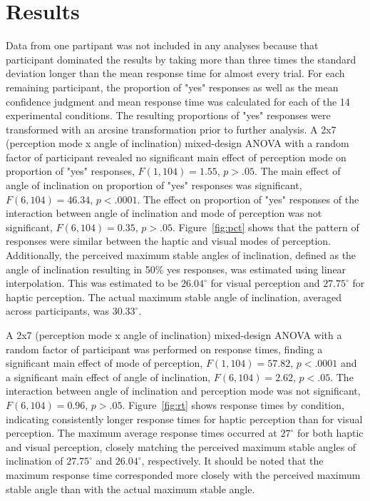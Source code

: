 \documentclass{article}
\begin{document}
\section{Results}
Data from one partipant was not included in any analyses because that participant dominated the results by taking more than three times the standard deviation longer than the mean response time for almost every trial. For each remaining participant, the proportion of "yes" responses as well as the mean confidence judgment and mean response time was calculated for each of the 14 experimental conditions.  The resulting proportions of "yes" responses were transformed with an arcsine transformation prior to further analysis. A 2x7 (perception mode x angle of inclination) mixed-design ANOVA with a random factor of participant revealed no significant main effect of perception mode on proportion of "yes" responses, $F(1, 104) = 1.55$, $p > .05$. The main effect of angle of inclination on proportion of "yes" responses was significant, $F(6, 104) = 46.34$, $p < .0001$. The effect on proportion of "yes" responses of the interaction between angle of inclination and mode of perception was not significant, $F(6, 104) = 0.35$, $p > .05$. Figure~\ref{fig:pct} shows that the pattern of responses were similar between the haptic and visual modes of perception. Additionally, the perceived maximum stable angles of inclination, defined as the angle of inclination resulting in 50\% yes responses, was estimated using linear interpolation. This was estimated to be $26.04^\circ$ for visual perception and $27.75^\circ$ for haptic perception. The actual maximum stable angle of inclination, averaged across participants, was $30.33^\circ$.

A 2x7 (perception mode x angle of inclination) mixed-design ANOVA with a random factor of participant was performed on response times, finding a significant main effect of mode of perception, $F(1, 104) = 57.82$, $p<.0001$ and a significant main effect of angle of inclination, $F(6, 104) = 2.62$, $p < .05$. The interaction between angle of inclination and perception mode was not significant, $F(6, 104) = 0.96$, $p > .05$. Figure~\ref{fig:rt} shows response times by condition, indicating consistently longer response times for haptic perception than for visual perception. The maximum average response times occurred at $27^\circ$ for both haptic and visual perception, closely matching the perceived maximum stable angles of inclination of $27.75^\circ$ and $26.04^\circ$, respectively. It should be noted that the maximum response time corresponded more closely with the perceived maximum stable angle than with the actual maximum stable angle.
\end{document}
